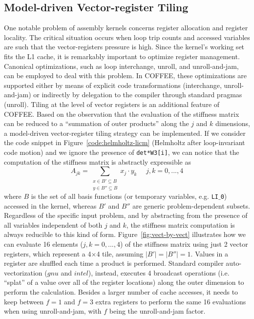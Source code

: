 \documentclass[conference]{IEEEtran}
\begin{document}
\subsection{Model-driven Vector-register Tiling}
One notable problem of assembly kernels concerns register allocation and register locality. The critical situation occurs when loop trip counts and accessed variables are such that the vector-registers pressure is high. Since the kernel's working set fits the L1 cache, it is remarkably important to optimize register management. Canonical optimizations, such as loop interchange, unroll, and unroll-and-jam, can be employed to deal with this problem. In COFFEE, these optimizations are supported either by means of explicit code transformations (interchange, unroll-and-jam) or indirectly by delegation to the compiler through standard pragmas (unroll). Tiling at the level of vector registers is an additional feature of COFFEE. Based on the observation that the evaluation of the stiffness matrix can be reduced to a ``summation of outer products'' along the $j$ and $k$ dimensions, a model-driven vector-register tiling strategy can be implemented. If we consider the code snippet in Figure~\ref{code:helmholtz-licm} (Helmholtz after loop-invariant code motion) and we ignore the presence of \texttt{det*W3[i]}, we can notice that the computation of the stiffness matrix is abstractly expressible as
\begin{equation}
\label{outer-product}
A_{jk} = \sum_{\substack{
  x \in B' \subseteq B \\ 
  y \in B'' \subseteq B}} 
x_j\cdot y_k ~~~~~~ j,k = 0,...,4
\end{equation}
where $B$ is the set of all basis functions (or temporary variables, e.g. \texttt{LI$\_$0}) accessed in the kernel, whereas $B'$ and $B''$ are generic problem-dependent subsets. Regardless of the specific input problem, and by abstracting from the presence of all variables independent of both $j$ and $k$, the stiffness matrix computation is always reducible to this kind of form. Figure~\ref{fig:vect-by-vect} illustrates how we can evaluate 16 elements ($j,k=0,...,4$) of the stiffness matrix using just 2 vector registers, which represent a 4$\times$4 tile, assuming $\vert B' \vert = \vert B'' \vert = 1$. Values in a register are shuffled each time a product is performed. Standard compiler auto-vectorization ($gnu$ and $intel$), instead, executes 4 broadcast operations (i.e. ``splat'' of a value over all of the register locations) along the outer dimension to perform the calculation. Besides a larger number of cache accesses, it needs to keep between $f=1$ and $f=3$ extra registers to perform the same 16 evaluations when using unroll-and-jam, with $f$ being the unroll-and-jam factor. 
\end{document}
